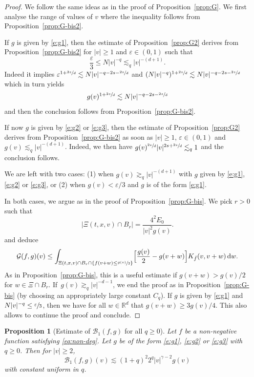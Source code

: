 \documentclass[JEP,XML,SOM,Unicode,NoFloatCountersInSection]{cedram}
\theoremstyle{plain}
\newtheorem{prop}[thm]{Proposition}
\theoremstyle{definition}
\numberwithin{equation}{section}
\newcommand{\R}{\mathbb R}
\newcommand{\eps}{\varepsilon}
\newcommand{\dd} {\, \mathrm{d}}
\let\A N
\begin{document}
\begin{proof}
We follow the same ideas as in the proof of
Proposition~\ref{prop:G}. We first analyse the range of values of
$v$ where the inequality follows from Proposition~\ref{prop:G-bis2}.

If $g$ is given by \eqref{e:g1}, then the estimate of
Proposition~\ref{prop:G2} derives from Proposition~\ref{prop:G-bis2}
for $|v| \ge 1$ and $\eps \in (0,1)$ such that
\[ \frac{\eps}3 \le \A |v|^{-q} \lesssim_q |v|^{-(d+1)}. \] Indeed
it implies
$\eps^{1+\sfrac{2s}d} \lesssim \A |v|^{-q - 2s - \sfrac{2s}d}$ and
$(\A |v|^{-q})^{1+\sfrac{2s}d} \lesssim \A |v|^{-q - 2s -
\sfrac{2s}d}$ which in turn yields
\[ g(v)^{1+\sfrac{2s}d} \lesssim \A |v|^{-q-2s - \sfrac{2s}d}\] and
then the conclusion follows from Proposition~\ref{prop:G-bis2}.

If now $g$ is given by \eqref{e:g2} or \eqref{e:g3}, then the
estimate of Proposition~\ref{prop:G2} derives from
Proposition~\ref{prop:G-bis2} as soon as $|v| \ge 1$,
$\eps \in (0,1)$ and $g(v) \lesssim_q |v|^{-(d+1)}$. Indeed, we then
have $g(v)^{\sfrac{2s}d} |v|^{2s + \sfrac{2s}d} \lesssim_q 1$ and the
conclusion follows.

We are left with two cases: (1) when $g(v) \gtrsim_q |v|^{-(d+1)}$ with
$g$ given by \eqref{e:g1}, \eqref{e:g2} or \eqref{e:g3}, or
(2) when $g(v) < \eps/3$ and $g$ is of the form \eqref{e:g1}.

In both cases, we argue as in the proof of
Proposition~\ref{prop:G-bis}. We pick $r>0$ such that
\[ \left|\Xi(t,x,v) \cap B_r\right| = \frac{4^2E_0}{|v|^2 g(v)}.\]
and deduce
\[
\mathcal G(f,g)(v) \leq \int_{\Xi(t,x,v) \cap B_r \cap \left\{f(v+w)
\le \sfrac{g(v)}{2}\right\}} \Bigl[ \frac{g(v)}{2} - g(v+w)\Bigr]
K_{\bar f}(v,v+w) \dd w.
\]
As in Proposition~\ref{prop:G-bis}, this is a useful estimate if
$g(v+w) > g(v)/2$ for $w \in \Xi \cap B_r$. If~$g(v) \gtrsim_q |v|^{-d-1}$, we end the proof as in
Proposition~\ref{prop:G-bis} (by choosing an appropriately large
constant $C_q$). If $g$ is given by \eqref{e:g1} and
$\A |v|^{-q} \le \sfrac\eps3$, then we have for all $w \in \R^d$ that
$g(v+w) \ge 3g(v)/4$. This also allows to continue the proof and
conclude.
\end{proof}

\begin{prop}[Estimate of {$\mathcal{B}_1(f,g)$} for all $q \ge
0$] \label{prop:B1-2} Let $f$ be a non-negative function satisfying \eqref{eq:non-deg}. Let $g$ be of
the form \eqref{e:g1}, \eqref{e:g2} or \eqref{e:g3} with $q \ge
0$. Then for $|v| \ge 2$,
\[ \mathcal{B}_1 (f,g)(v) \lesssim (1+q)^2 2^q |v|^{\gamma -2} g(v)\]
with constant uniform in $q$.
\end{prop}
\end{document}
